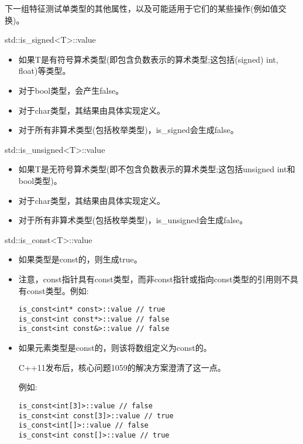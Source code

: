 
下一组特征测试单类型的其他属性，以及可能适用于它们的某些操作(例如值交换)。


std::is\_signed<T>::value

\begin{itemize}
\item 
如果T是有符号算术类型(即包含负数表示的算术类型;这包括(signed) int, float)等类型。

\item 
对于bool类型，会产生false。

\item 
对于char类型，其结果由具体实现定义。

\item 
对于所有非算术类型(包括枚举类型)，is\_signed会生成false。
\end{itemize}

std::is\_unsigned<T>::value

\begin{itemize}
\item 
如果T是无符号算术类型(即不包含负数表示的算术类型;这包括unsigned int和bool类型)。

\item 
对于char类型，其结果由具体实现定义。

\item 
对于所有非算术类型(包括枚举类型)，is\_unsigned会生成false。
\end{itemize}

std::is\_const<T>::value

\begin{itemize}
\item 
如果类型是const的，则生成true。

\item 
注意，const指针具有const类型，而非const指针或指向const类型的引用则不具有const类型。例如:
\begin{lstlisting}[style=styleCXX]
is_const<int* const>::value // true
is_const<int const*>::value // false
is_const<int const&>::value // false
\end{lstlisting}

\item 
如果元素类型是const的，则该将数组定义为const的。

\begin{tcolorbox}[colback=webgreen!5!white,colframe=webgreen!75!black]
\hspace*{0.75cm}C++11发布后，核心问题1059的解决方案澄清了这一点。
\end{tcolorbox}

例如:
\begin{lstlisting}[style=styleCXX]
is_const<int[3]>::value // false
is_const<int const[3]>::value // true
is_const<int[]>::value // false
is_const<int const[]>::value // true
\end{lstlisting}

\end{itemize}


